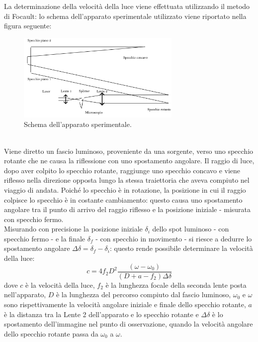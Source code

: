 \documentclass[]{article}
\begin{document}
    La determinazione della velocità della luce viene effettuata utilizzando il metodo di Focault: lo schema dell'apparato sperimentale utilizzato viene riportato nella figura seguente:
    \begin{figure}[!h]
        \centering
        \includegraphics[width=0.70\textwidth]{disegnetto-apparato.png}
        \caption{Schema dell'apparato sperimentale.}
        \label{schema}
    \end{figure} \\ 
    Viene diretto un fascio luminoso, proveniente da una sorgente, verso uno specchio rotante che ne causa la riflessione con uno spostamento angolare.
    Il raggio di luce, dopo aver colpito lo specchio rotante, raggiunge uno specchio concavo e viene riflesso nella direzione opposta lungo la stessa traiettoria che aveva compiuto nel viaggio di andata. Poiché lo specchio è in rotazione, la posizione in cui il raggio colpisce lo specchio è in costante cambiamento: questo causa uno spostamento angolare tra il punto di arrivo del raggio riflesso e la posizione iniziale - misurata con specchio fermo.\\
    Misurando con precisione la posizione iniziale $ \delta _i $ dello spot luminoso - con specchio fermo - e la finale  $ \delta _f $ - con specchio in movimento - si riesce a dedurre lo spostamento angolare $ \Delta \delta = \delta_f - \delta_i $: questo rende possibile determinare la velocità della luce:
    \begin{equation}
        \label{eqn-c}
        c=4 f_2 D^2 \frac{(\omega -\omega_0)}{(D+a-f_2)\Delta \delta }
    \end{equation}
    dove $ c $ è la velocità della luce, $ f_2 $ è la lunghezza focale della seconda lente posta nell'apparato, $ D $ è la lunghezza del percorso compiuto dal fascio luminoso, $ \omega_0 $ e $ \omega $ sono rispettivamente la velocità angolare iniziale e finale dello specchio rotante, $ a $ è la distanza tra la Lente 2 dell'apparato e lo specchio rotante e $ \Delta\delta$ è lo spostamento dell'immagine nel punto di osservazione, quando la velocità angolare dello specchio rotante passa da $ \omega_0 $ a $ \omega $.
\end{document}
